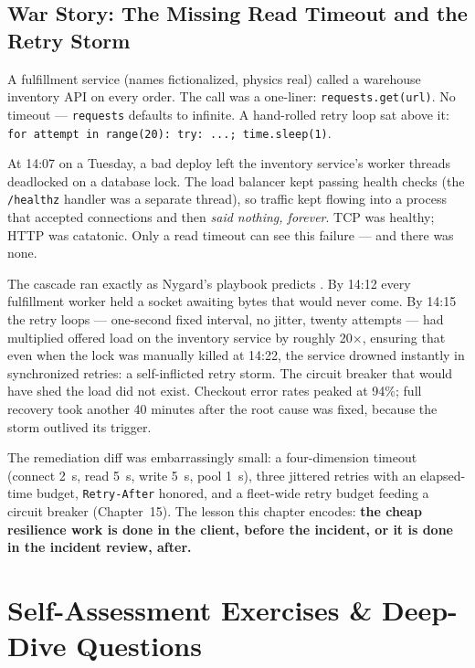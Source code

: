 \subsection{War Story: The Missing Read Timeout and the Retry Storm}
\label{sec:ch02-warstory}

A fulfillment service (names fictionalized, physics real) called a warehouse
inventory API on every order. The call was a one-liner:
\texttt{requests.get(url)}. No timeout --- \texttt{requests} defaults to
infinite. A hand-rolled retry loop sat above it: \texttt{for attempt in
range(20): try: ...; time.sleep(1)}.

At 14:07 on a Tuesday, a bad deploy left the inventory service's worker
threads deadlocked on a database lock. The load balancer kept passing health
checks (the \texttt{/healthz} handler was a separate thread), so traffic kept
flowing into a process that accepted connections and then \emph{said nothing,
forever}. TCP was healthy; HTTP was catatonic. Only a read timeout can see
this failure --- and there was none.

The cascade ran exactly as Nygard's playbook predicts
\cite{nygard2018releaseit}. By 14:12 every fulfillment worker held a socket
awaiting bytes that would never come. By 14:15 the retry loops --- one-second
fixed interval, no jitter, twenty attempts --- had multiplied offered load on
the inventory service by roughly 20$\times$, ensuring that even when the lock
was manually killed at 14:22, the service drowned instantly in synchronized
retries: a self-inflicted retry storm. The circuit breaker that would have
shed the load did not exist. Checkout error rates peaked at 94\%; full
recovery took another 40 minutes after the root cause was fixed, because the
storm outlived its trigger.

The remediation diff was embarrassingly small: a four-dimension timeout
(connect 2~s, read 5~s, write 5~s, pool 1~s), three jittered retries with an
elapsed-time budget, \texttt{Retry-After} honored, and a fleet-wide retry
budget feeding a circuit breaker (Chapter~15). The lesson this chapter
encodes: \textbf{the cheap resilience work is done in the client, before the
incident, or it is done in the incident review, after.}


\section{Self-Assessment Exercises \& Deep-Dive Questions}

